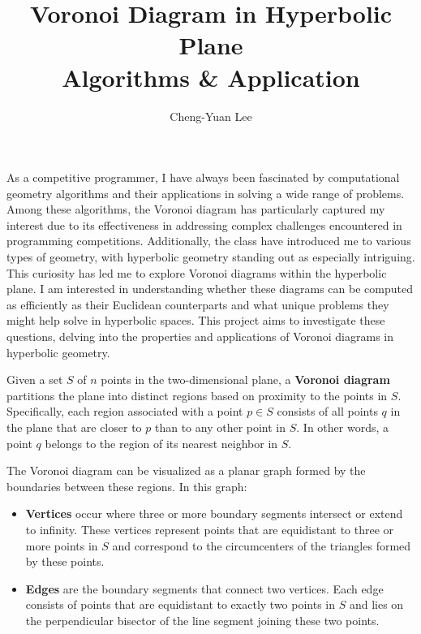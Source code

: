 \documentclass[minted, draw]{hebdomon}
\begin{document}
\title{Voronoi Diagram in Hyperbolic Plane\\ Algorithms \& Application}
\date{Cheng-Yuan Lee}

\maketitle
\dominitoc
\newpage


As a competitive programmer, I have always been fascinated by computational geometry algorithms and their applications in solving a wide range of problems. Among these algorithms, the Voronoi diagram has particularly captured my interest due to its effectiveness in addressing complex challenges encountered in programming competitions. Additionally, the class have introduced me to various types of geometry, with hyperbolic geometry standing out as especially intriguing.
This curiosity has led me to explore Voronoi diagrams within the hyperbolic plane. I am interested in understanding whether these diagrams can be computed as efficiently as their Euclidean counterparts and what unique problems they might help solve in hyperbolic spaces. This project aims to investigate these questions, delving into the properties and applications of Voronoi diagrams in hyperbolic geometry.



Given a set \( S \) of \( n \) points in the two-dimensional plane, a \textbf{Voronoi diagram} partitions the plane into distinct regions based on proximity to the points in \( S \). Specifically, each region associated with a point \( p \in S \) consists of all points \( q \) in the plane that are closer to \( p \) than to any other point in \( S \). In other words, a point \( q \) belongs to the region of its nearest neighbor in \( S \).

The Voronoi diagram can be visualized as a planar graph formed by the boundaries between these regions. In this graph:
\begin{itemize}
    \item \textbf{Vertices} occur where three or more boundary segments intersect or extend to infinity. These vertices represent points that are equidistant to three or more points in \( S \) and correspond to the circumcenters of the triangles formed by these points.
    \item \textbf{Edges} are the boundary segments that connect two vertices. Each edge consists of points that are equidistant to exactly two points in \( S \) and lies on the perpendicular bisector of the line segment joining these two points.
\end{itemize}
\end{document}
